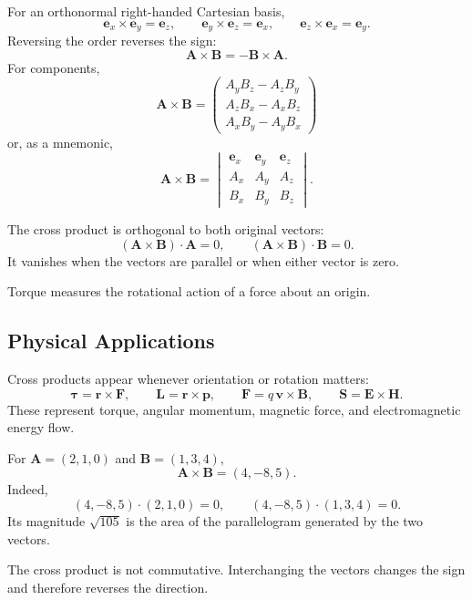 For an orthonormal right-handed Cartesian basis,
\[
\mathbf e_x\times\mathbf e_y=\mathbf e_z,\qquad
\mathbf e_y\times\mathbf e_z=\mathbf e_x,\qquad
\mathbf e_z\times\mathbf e_x=\mathbf e_y.
\]
Reversing the order reverses the sign:
\[
\mathbf A\times\mathbf B=-\mathbf B\times\mathbf A.
\]
For components,
\[
\boxed{
\mathbf A\times\mathbf B=
\begin{pmatrix}
A_yB_z-A_zB_y\\
A_zB_x-A_xB_z\\
A_xB_y-A_yB_x
\end{pmatrix}}
\]
or, as a mnemonic,
\[
\mathbf A\times\mathbf B=
\begin{vmatrix}
\mathbf e_x&\mathbf e_y&\mathbf e_z\\
A_x&A_y&A_z\\
B_x&B_y&B_z
\end{vmatrix}.
\]

\begin{propertybox}[Orthogonality]
The cross product is orthogonal to both original vectors:
\[
(\mathbf A\times\mathbf B)\cdot\mathbf A=0,
\qquad
(\mathbf A\times\mathbf B)\cdot\mathbf B=0.
\]
It vanishes when the vectors are parallel or when either vector is zero.
\end{propertybox}

\begin{bookfigure}{Torque measures the rotational action of a force about an origin.}

\label{fig:torque-lever-arm}
\end{bookfigure}

\subsection{Physical Applications}

Cross products appear whenever orientation or rotation matters:
\[
\boldsymbol\tau=\mathbf r\times\mathbf F,
\qquad
\mathbf L=\mathbf r\times\mathbf p,
\qquad
\mathbf F=q\,\mathbf v\times\mathbf B,
\qquad
\mathbf S=\mathbf E\times\mathbf H.
\]
These represent torque, angular momentum, magnetic force, and electromagnetic energy flow.

\begin{workedexample}
For $\mathbf A=(2,1,0)$ and $\mathbf B=(1,3,4)$,
\[
\mathbf A\times\mathbf B=(4,-8,5).
\]
Indeed,
\[
(4,-8,5)\cdot(2,1,0)=0,
\qquad
(4,-8,5)\cdot(1,3,4)=0.
\]
Its magnitude $\sqrt{105}$ is the area of the parallelogram generated by the two vectors.
\end{workedexample}

\begin{warningbox}
The cross product is not commutative. Interchanging the vectors changes the sign and therefore reverses the direction.
\end{warningbox}

